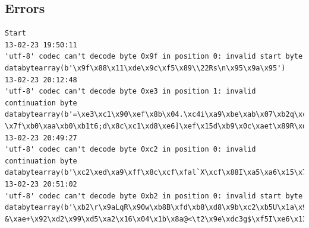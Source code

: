 \begin{appendices}
\begin{landscape}
\chapter{Errors}
\begin{lstlisting}[caption={Decoding error}, label=error:decoding]
Start
13-02-23 19:50:11
'utf-8' codec can't decode byte 0x9f in position 0: invalid start byte
databytearray(b'\x9f\x88\x11\xde\x9c\xf5\x89\\22Rs\n\x95\x9a\x95')
13-02-23 20:12:48
'utf-8' codec can't decode byte 0xe3 in position 1: invalid continuation byte
databytearray(b'=\xe3\xc1\x90\xef\x8b\x04.\xc4i\xa9\xbe\xab\x07\xb2q\xc24\xbd\xec\xc1\xb54H`\x9c#k\xaeG\x92\x0f\x17\xdd\xafr\xd0\xa5V \x7f\xb0\xaa\xb0\xb1t6;d\x8c\xc1\xd8\xe6]\xef\x15d\xb9\x0c\xaet\x89R\xdbTF\x0b\xa5%=o\x96')
13-02-23 20:49:27
'utf-8' codec can't decode byte 0xc2 in position 0: invalid continuation byte
databytearray(b'\xc2\xed\xa9\xff\x8c\xcf\xfal`X\xcf\x88I\xa5\xa6\x15\x7f\x9b\xa7^c\xbf\xac')
13-02-23 20:51:02
'utf-8' codec can't decode byte 0xb2 in position 0: invalid start byte
databytearray(b'\xb2\r\x9aLqR\x90w\xb8B\xfd\xb8\xd8\x9b\xc2\xb5U\x1a\x9e;\xda\x02v\xdb\x95`-&\xae+\x92\xd2\x99\xd5\xa2\x16\x04\x1b\x8a@<\t2\x9e\xdc3g$\xf5I\xe6\x13\x8aJ\xfa\x85\xb3v+\xa9\x03He\x16\xb8\xad\xdf')
\end{lstlisting}
\end{landscape}

\end{appendices}